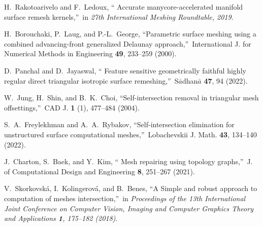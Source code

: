 \documentclass[
11pt,
tightenlines,
twoside,
onecolumn,
nofloats,
nobibnotes,
nofootinbib,
superscriptaddress,
noshowpacs,
centertags]
{revtex4-2}
\begin{document}
\begin{thebibliography}{99}
 H.~Rakotoarivelo and F.~Ledoux, \textquotedblleft
Accurate manycore-accelerated  manifold surface remesh
kernels,\textquotedblright \ in \textit{27th International Meshing
Roundtable, 2019}.

 H.~Borouchaki, P.~Laug, and P.-L.~George,
\textquotedblleft Parametric surface  meshing using a combined
advancing-front generalized Delaunay approach,\textquotedblright \
International J. for Numerical Methods in Engineering {\bf 49},
233--259 (2000).

 D.~Panchal and D.~Jayaswal, \textquotedblleft
Feature  sensitive geometrically faithful highly regular direct
triangular isotropic surface remeshing,\textquotedblright \
S$\bar{a}$dhan$\bar{a}$ {\bf 47}, 94 (2022).

 W.~Jung, H.~Shin, and B.~K.~Choi,
\textquotedblleft Self-intersection  removal in triangular mesh
offsettings,\textquotedblright \ CAD J. {\bf 1} (1), 477--484
(2004).

 S.~A.~Freylekhman and A.~A.~Rybakov,
\textquotedblleft Self-intersection elimination  for unstructured
surface computational meshes,\textquotedblright \ Lobachevskii J.
Math. {\bf 43}, 134--140 (2022).

 J.~Charton, S.~Baek, and Y.~Kim, \textquotedblleft
Mesh  repairing using topology graphs,\textquotedblright \ J. of
Computational Design and Engineering {\bf 8}, 251--267 (2021).

 V.~Skorkovsk\'a, I.~Kolingerov\'a, and B.~Benes,
\textquotedblleft A Simple  and robust approach to computation of
meshes intersection,\textquotedblright \ in \textit{Proceedings of
the 13th International Joint Conference on Computer Vision, Imaging
and Computer Graphics Theory and Applications {\bf 1}, 175--182
(2018)}.

\end{thebibliography}
\end{document}
